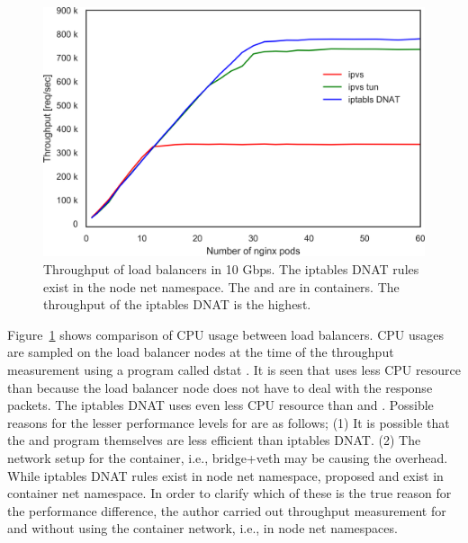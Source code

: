 \begin{figure}[h]
  \centering
  \includegraphics[width=0.8\columnwidth]{Figs/ipvs_l3dsr_10g}
  \par\bigskip
  \centering
  \begin{minipage}{0.9\columnwidth}
    \caption[Throughput of load balancers in 10 Gbps]{
      Throughput of load balancers in 10 Gbps.
      The iptables DNAT rules exist in the node net namespace.
      The  and  are in containers.
      The throughput of the iptables DNAT is the highest.
    }
    \label{fig:ipvs_l3dsr_10g}
  \end{minipage}
\end{figure}

Figure~\ref{fig:ipvs_l3dsr_10g} shows comparison of CPU usage between load balancers.
CPU usages are sampled on the load balancer nodes at the time of the throughput measurement using a program called dstat \cite{wieers2019dstat}.
It is seen that  uses less CPU resource than  because the load balancer node does not have to deal with the response packets.
The iptables DNAT uses even less CPU resource than  and .
Possible reasons for the lesser performance levels for  are as follows;
(1) It is possible that the  and  program themselves are less efficient than iptables DNAT.
(2) The network setup for the container, i.e., bridge+veth may be causing the overhead.
While iptables DNAT rules exist in node net namespace, proposed  and  exist in container net namespace.
In order to clarify which of these is the true reason for the performance difference, the author carried out throughput measurement for  and  without using the container network, i.e., in node net namespaces.

